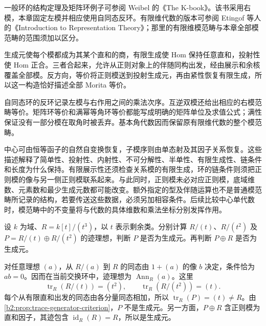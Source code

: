 \ProseParagraphBreak
一般环的结构定理及矩阵环例子可参阅 Weibel 的《The K-book》\cite[Chapter II, Theorem 2.7, Example 2.7.2]{Weibel2013KBook}。该书采用右模，本章固定左模并相应使用自同态反环。有限维代数的版本可参阅 Etingof 等人的《Introduction to Representation Theory》\cite[Theorem 9.6.4, Problem 9.6.5, p. 215; Section 9.7, p. 216]{EtingofEtAl2011RepresentationTheory}；那里的有限维模范畴与本章全部模范畴的范围须加以区分。






\begin{chaptersummary}
	生成元使每个模都成为其某个直和的商，有限生成使 Hom 保持任意直和，投射性使 Hom 正合。三者合起来，允许从正则对象上的伴随同构出发，经由展示和余核覆盖全部模。反方向，等价将正则模送到投射生成元，再由紧性恢复有限生成，所以这一构造恰好描述全部 Morita 等价。

	\ProseParagraphBreak
	自同态环的反环记录左模与右作用之间的乘法次序。互逆双模还给出相应的右模范畴等价。矩阵环等价和满幂等角环等价都能写成明确的矩阵单位及求值公式；满性保证没有一部分模在取角时被丢弃。基本角代数因而保留原有限维代数的整个模范畴。

	\ProseParagraphBreak
	中心可由恒等函子的自然自变换恢复，子模序则由单态射及其因子关系恢复。这些描述解释了简单性、投射性、内射性、不可分解性、半单性、有限生成性、链条件和长度为什么保持。有限展示性还须检查关系模的有限生成，环的链条件则须把正则模的像与另一侧正则模联系起来。与此同时，正则模未必对应正则模，底域维数、元素数和最少生成元数都可能改变。额外指定的型及伴随运算也不是普通模范畴所记录的结构，若要传送这些数据，必须另加相容条件。后续比较中心单代数时，模范畴中的不变量将与代数的具体维数和乘法坐标分别发挥作用。
\end{chaptersummary}

\BookExercises

\begin{exercise}\label{b2:ex:16-trace-generator}
	设 \(k\) 为域、\(R=k[t]/(t^3)\)，以 \(t\) 表示剩余类。分别计算 \(R/(t)\)、\(R/(t^2)\) 及 \(P=R/(t)\oplus R/(t^2)\) 的迹理想，判断 \(P\) 是否为生成元。再判断 \(P\oplus R\) 是否为生成元。
\end{exercise}
\begin{solution}
	对任意理想 \((a)\)，从 \(R/(a)\) 到 \(R\) 的同态由 \(1+(a)\) 的像 \(b\) 决定，条件恰为 \(ab=0\)。因而在当前交换环中，迹理想为 \(\operatorname{Ann}_R(a)\)。这里
	\[
		\operatorname{tr}_R(R/(t))=(t^2),\qquad \operatorname{tr}_R(R/(t^2))=(t).
	\]
	每个从有限直和出发的同态由各分量同态相加，所以 \(\operatorname{tr}_R(P)=(t)\ne R\)。由\cref{b2:prop:trace-generator-criterion}，\(P\) 不是生成元。另一方面，\(P\oplus R\) 含正则模为直和因子，其迹包含 \(\operatorname{id}_R(R)=R\)，所以是生成元。
\end{solution}

